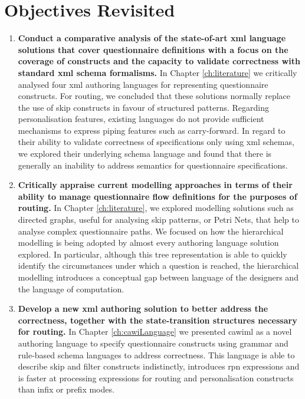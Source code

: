	\section{Objectives Revisited}\label{sec:conclusion:objectivesRevisited}
		\begin{enumerate}
			\item \textbf{Conduct a comparative analysis of the state-of-art \gls{xml} language solutions that cover questionnaire definitions with a focus on the coverage of constructs and the capacity to validate correctness with standard \gls{xml} schema formalisms.} In Chapter \ref{ch:literature} we critically analysed four \gls{xml} authoring languages for representing questionnaire constructs. For routing, we concluded that these solutions normally replace the use of skip constructs in favour of structured patterns. Regarding personalisation features, existing languages do not provide sufficient mechanisms to express piping features such as carry-forward. In regard to their ability to validate correctness of specifications only using \gls{xml} schemas, we explored their underlying schema language and found that there is generally an inability to address semantics for questionnaire specifications.

			\item \textbf{Critically appraise current modelling approaches in terms of their ability to manage questionnaire flow definitions for the purposes of routing.} In Chapter \ref{ch:literature}, we explored modelling solutions such as directed graphs, useful for analysing skip patterns, or Petri Nets, that help to analyse complex questionnaire paths. We focused on how the hierarchical modelling is being adopted by almost every authoring language solution explored. In particular, although this tree representation is able to quickly identify the circumstances under which a question is reached, the hierarchical modelling introduces a conceptual gap between language of the designers and the language of computation.

			\item \textbf{Develop a new \gls{xml} authoring solution to better address the correctness, together with the state-transition structures necessary for routing.} In Chapter \ref{ch:cawiLanguage} we presented \gls{cawiml} as a novel authoring language to specify questionnaire constructs using grammar and rule-based schema languages to address correctness. This language is able to describe skip and filter constructs indistinctly, introduces \gls{rpn} expressions and is faster at processing expressions for routing and personalisation constructs than infix or prefix modes.


\end{enumerate}
